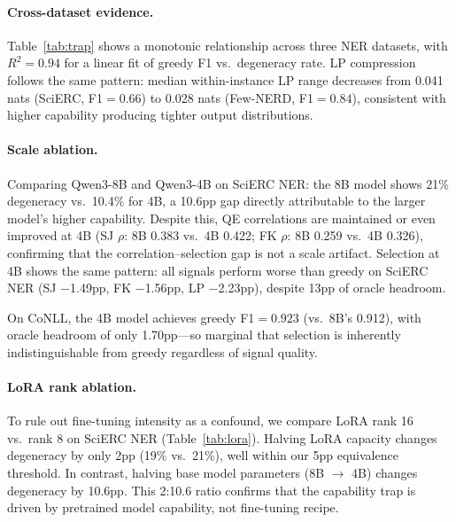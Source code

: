 \documentclass[11pt,twocolumn]{article}
\begin{document}
\paragraph{Cross-dataset evidence.}
Table~\ref{tab:trap} shows a monotonic relationship across three NER datasets, with $R^2{=}0.94$ for a linear fit of greedy F1 vs.\ degeneracy rate.
LP compression follows the same pattern: median within-instance LP range decreases from 0.041 nats (SciERC, F1${=}0.66$) to 0.028 nats (Few-NERD, F1${=}0.84$), consistent with higher capability producing tighter output distributions.

\paragraph{Scale ablation.}
Comparing Qwen3-8B and Qwen3-4B on SciERC NER:
the 8B model shows 21\% degeneracy vs.\ 10.4\% for 4B, a 10.6pp gap directly attributable to the larger model's higher capability.
Despite this, QE correlations are maintained or even improved at 4B (SJ $\rho$: 8B 0.383 vs.\ 4B 0.422; FK $\rho$: 8B 0.259 vs.\ 4B 0.326), confirming that the correlation--selection gap is not a scale artifact.
Selection at 4B shows the same pattern: all signals perform worse than greedy on SciERC NER (SJ $-$1.49pp, FK $-$1.56pp, LP $-$2.23pp), despite 13pp of oracle headroom.

On CoNLL, the 4B model achieves greedy F1${=}0.923$ (vs.\ 8B's 0.912), with oracle headroom of only 1.70pp---so marginal that selection is inherently indistinguishable from greedy regardless of signal quality.

\paragraph{LoRA rank ablation.}
To rule out fine-tuning intensity as a confound, we compare LoRA rank 16 vs.\ rank 8 on SciERC NER (Table~\ref{tab:lora}).
Halving LoRA capacity changes degeneracy by only 2pp (19\% vs.\ 21\%), well within our 5pp equivalence threshold.
In contrast, halving base model parameters (8B $\rightarrow$ 4B) changes degeneracy by 10.6pp.
This 2:10.6 ratio confirms that the capability trap is driven by pretrained model capability, not fine-tuning recipe.
\end{document}
